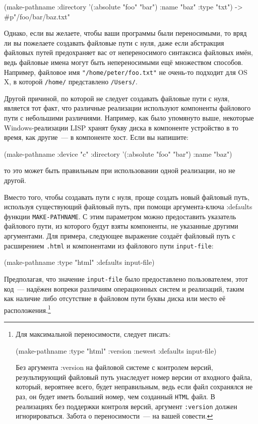 \begin{myverb}
(make-pathname
  :directory '(:absolute "foo" "bar")
  :name "baz"
  :type "txt") ->  #p"/foo/bar/baz.txt"
\end{myverb}

Однако, если вы желаете, чтобы ваши программы были переносимыми, то вряд ли вы пожелаете
создавать файловые пути с нуля, даже если абстракция файловых путей предохраняет вас от
непереносимого синтаксиса файловых имён, ведь файловые имена могут быть непереносимыми ещё
множеством способов. Например, файловое имя \lstinline{"/home/peter/foo.txt"} не очень-то
подходит для OS X, в которой \lstinline{/home/} представлено \lstinline{/Users/}.

Другой причиной, по которой не следует создавать файловые пути с нуля, является тот факт,
что различные реализации используют компоненты файлового пути с небольшими
различиями. Например, как было упомянуто выше, некоторые Windows-реализации LISP хранят
букву диска в компоненте устройство в то время, как другие~--- в компоненте хост. Если вы
напишите:

\begin{myverb}
(make-pathname :device "c" :directory '(:absolute "foo" "bar") :name "baz") 
\end{myverb}

то это может быть правильным при использовании одной реализации, но не другой.

Вместо того, чтобы создавать пути с нуля, проще создать новый файловый путь, используя
существующий файловый путь, при помощи аргумента-ключа :defaults функции
\lstinline{MAKE-PATHNAME}. С этим параметром можно предоставить указатель файлового пути, из
которого будут взяты компоненты, не указанные другими аргументами. Для примера, следующее
выражение создаёт файловый путь с расширением \lstinline{.html} и компонентами из файлового
пути \lstinline{input-file}:

\begin{myverb}
(make-pathname :type "html" :defaults input-file) 
\end{myverb}

Предполагая, что значение \lstinline{input-file} было предоставлено пользователем, этот код~---
надёжен вопреки различиям операционных систем и реализаций, таким как наличие либо
отсутствие в файловом пути буквы диска или место её расположения.\footnote{Для
  максимальной переносимости, следует писать:

\begin{myverb}
(make-pathname :type "html" :version :newest :defaults input-file) 
\end{myverb}

Без аргумента :version на файловой системе с контролем версий, результирующий файловый
путь унаследует номер версии от входного файла, который, вероятнее всего, будет
неправильным, ведь если файл сохранялся не раз, он будет иметь больший номер, чем
созданный \lstinline{HTML} файл. В реализациях без поддержки контроля версий, аргумент
\lstinline{:version} должен игнорироваться. Забота о переносимости~--- на вашей совести.}

